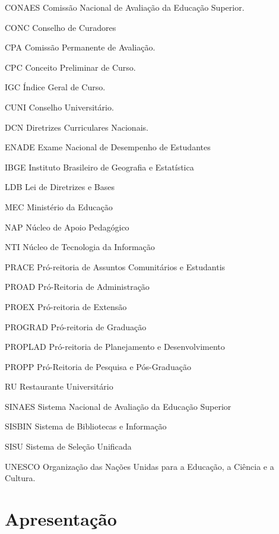 \documentclass[
	12pt,				%
	openright,			%
	oneside,			%
	a4paper,			%
	english,			%
	brazil				%
	]{abntex2}
\begin{document}
\begin{siglas}
\item[CONAES] Comissão Nacional de Avaliação da Educação Superior.
\item[CONC] Conselho de Curadores
\item[CPA] Comissão Permanente de Avaliação.
\item[CPC] Conceito Preliminar de Curso.
\item[IGC] Índice Geral de Curso.
\item[CUNI] Conselho Universitário.
\item[DCN] Diretrizes Curriculares Nacionais.
\item[ENADE] Exame Nacional de Desempenho de Estudantes
\item[IBGE] Instituto Brasileiro de Geografia e Estatística
\item[LDB] Lei de Diretrizes e Bases
\item[MEC] Ministério da Educação
\item[NAP] Núcleo de Apoio Pedagógico
\item[NTI] Núcleo de Tecnologia da Informação
\item[PRACE] Pró-reitoria de Assuntos Comunitários e Estudantis
\item[PROAD] Pró-Reitoria de Administração
\item[PROEX] Pró-reitoria de Extensão
\item[PROGRAD] Pró-reitoria de Graduação
\item[PROPLAD] Pró-reitoria de Planejamento e Desenvolvimento
\item[PROPP] Pró-Reitoria de Pesquisa e Pós-Graduação
\item[RU] Restaurante Universitário
\item[SINAES] Sistema Nacional de Avaliação da Educação Superior
\item[SISBIN] Sistema de Bibliotecas e Informação
\item[SISU] Sistema de Seleção Unificada
\item[UNESCO] Organização das Nações Unidas para a Educação, a Ciência e a Cultura.
\end{siglas}

\listoftables*
\cleardoublepage
\textual
\chapter{Apresentação}
\end{document}
